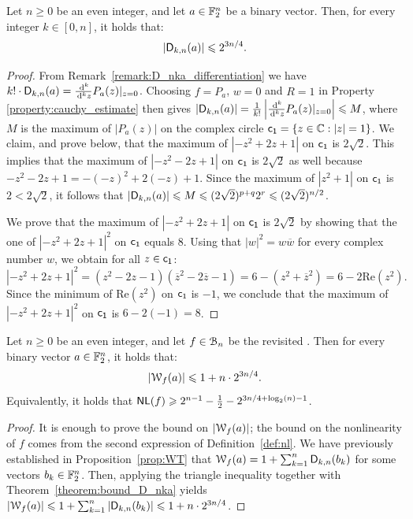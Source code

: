 \documentclass{llncs}
\begin{document}
\begin{theorem}\label{theorem:bound_D_nka}
    Let $n\geq 0$ be an even integer, and let $a\in\F_2^n$ be a binary vector. Then, for every integer $k\in[0,n]$, it holds that:
    \[
        |\Dnka nka|\leq 2^{3n/4}.
    \]
\end{theorem}

\begin{proof}
    From Remark~\ref{remark:D_nka_differentiation} we have $k!\cdot\Dnka nka=\frac{\dd^k}{\dd^k z}P_a(z)\vert_{z=0}$. Choosing $f=P_a$, $w=0$ and $R=1$ in Property \ref{property:cauchy_estimate} then gives $|\Dnka nka|=\frac{1}{k!}\left|\frac{\dd^k}{\dd^k z}P_a(z)\vert_{z=0}\right|\leq M$, where $M$ is the maximum of $|P_a(z)|$ on the complex circle $\dis=\{ z \in \C: |z|=1  \}$. We claim, and prove below, that the maximum of $\left|-z^2+2z+1\right|$ on $\dis$ is $2\sqrt 2$. This implies that the maximum of $\left|-z^2-2z+1\right|$ on $\dis$ is $2\sqrt 2$ as well because $-z^2-2z+1=-(-z)^2+2(-z)+1$. Since the maximum of $\left|z^2+1\right|$ on $\dis$ is $2<2\sqrt 2$, it follows that $|\Dnka nka|\leq M\leq (2\sqrt 2)^{p+q}2^r\leq (2\sqrt 2)^{n/2}$.

	We prove that the maximum of $|-z^2+2z+1|$ on $\dis$ is $2\sqrt 2$ by showing that the one of $|-z^2+2z+1|^2$ on $\dis$ equals $8$. Using that $|w|^2=w\overline w$ for every complex number $w$, we obtain for all $z\in \dis$:
    \[
        \left|-z^2+2z+1\right|^2=\left(z^2-2z-1\right)\left(\overline z^2-2\overline z-1\right)=6-\left(z^2+\overline z^2\right)=6-2\mathrm{Re}\left(z^2\right).
    \]
    Since the minimum of $\mathrm{Re}\left(z^2\right)$ on $\dis$ is $-1$, we conclude that the maximum of $|-z^2+2z+1|^2$ on $\dis$ is $6-2(-1)=8$.
\end{proof}

\begin{Corollary}\label{cor:bound_walsh_cauchy}
    Let $n\geq 0$ be an even integer, and let $f\in\BN$ be the revisited \hwbf{}. Then for every binary vector $a\in\F_2^n$, it holds that:
    \[
        |\wt f(a)|\leq 1+n\cdot 2^{3n/4}.
    \]
    Equivalently, it holds that $\NL(f)\geq 2^{n-1} - \frac{1}{2} -2^{3n/4 + \log_2(n) -1}$.
\end{Corollary}

\begin{proof}
    It is enough to prove the bound on $|\wt f(a)|$; the bound on the nonlinearity of $f$ comes from the second expression of Definition~\ref{def:nl}. We have previously established in Proposition~\ref{prop:WT} that $\wt{f}(a)=1+\sum_{k=1}^n\Dnka{n}{k}{b_k}$ for some vectors $b_k\in\F_2^n$. Then, applying the triangle inequality together with Theorem~\ref{theorem:bound_D_nka} yields $|\wt{f}(a)|\leq 1+\sum_{k=1}^n\left|\Dnka{n}{k}{b_k}\right|\leq 1+ n\cdot 2^{3n/4}$.
\end{proof}
\end{document}
